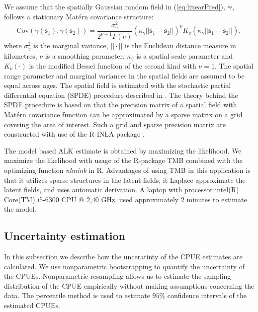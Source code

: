 \documentclass[a4paper 12pt]{article}
\numberwithin{equation}{section}
\begin{document}
\indent We assume that the spatially Gaussian random field in (\ref{eq:linearPred}), $\pmb{\gamma}$, follows a stationary Mat\'{e}rn covariance structure:
\begin{equation}\label{eq:matern}
 \text{Cov}(\gamma(\mathbf{s}_1),\gamma(\mathbf{s}_2)) = \frac{\sigma^2_{\gamma}}{2^{\nu-1}\Gamma(\nu)}(\kappa_{\gamma}||\mathbf{s}_1 -\mathbf{s}_2||)^{\nu}K_{\nu}(\kappa_{\gamma}||\mathbf{s}_1-\mathbf{s}_2||),
\end{equation}
where $\sigma^2_{\gamma}$ is the marginal variance, $||\cdot||$ is the Euclidean distance measure in kilometres, $\nu$ is a smoothing parameter, $\kappa_{\gamma}$ is a spatial scale parameter and $K_{\nu}(\cdot)$ is the modified Bessel function of the second kind with $\nu = 1$. The spatial range parameter and marginal variances in the spatial fields are assumed to be equal across ages. The spatial field is estimated with the stochastic partial differential equation (SPDE) procedure described in \citet{lindgren2011explicit}. The theory behind the SPDE procedure is based on that the precision matrix of a spatial field with Mat\'{e}rn  covariance function can be approximated by a sparse matrix on a grid covering the area of interest. Such a grid and sparse precision matrix are constructed with use of the R-INLA package \citep{rue2009approximate}.

The model based ALK estimate is obtained by maximizing the likelihood. We maximize the likelihood with usage of the R-package TMB \citep{kristensen2015tmb} combined with the optimizing function \textit{nlminb} in R. Advantages of using TMB in this application is that it utilizes sparse structures in the latent fields, it Laplace approximate the latent fields, and uses automatic derivation. A laptop with  processor intel(R) Core(TM) i5-6300 CPU @ 2,40 GHz, used approximately 2 minutes to estimate the model.  

\subsection{Uncertainty estimation}
\label{sec:uncertaintyestimation}
In this subsection we describe how the unceratinty of the CPUE estimates are calculated. We use nonparametric bootstrapping to quantify the uncertainty of the CPUEs. Nonparametric resampling allows us to estimate the sampling distribution of the CPUE empirically without making assumptions concerning the data. The percentile method is used to estimate $95\%$ confidence intervals of the estimated CPUEs. %
\end{document}
